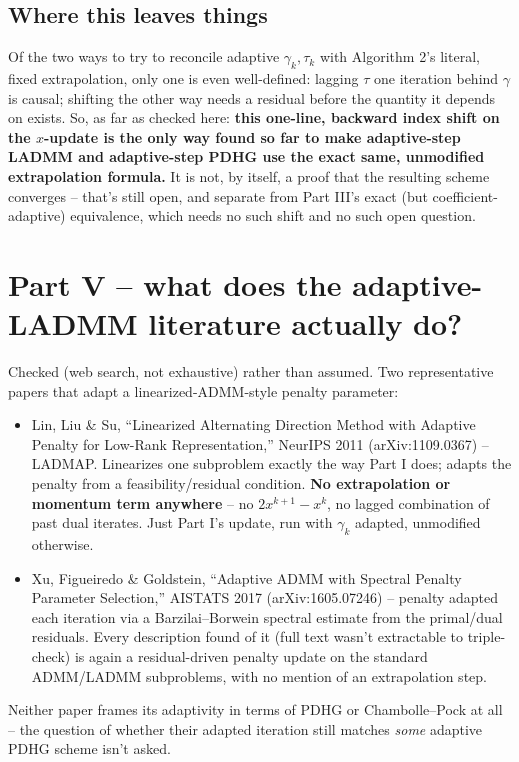 \documentclass[11pt]{article}
\begin{document}
\subsection*{Where this leaves things}
Of the two ways to try to reconcile adaptive $\gamma_k,\tau_k$ with Algorithm 2's
literal, fixed extrapolation, only one is even well-defined: lagging $\tau$ one
iteration behind $\gamma$ is causal; shifting the other way needs a residual before the
quantity it depends on exists. So, as far as checked here: \textbf{this one-line,
backward index shift on the $x$-update is the only way found so far to make
adaptive-step LADMM and adaptive-step PDHG use the exact same, unmodified extrapolation
formula.} It is not, by itself, a proof that the resulting scheme converges -- that's
still open, and separate from Part III's exact (but coefficient-adaptive) equivalence,
which needs no such shift and no such open question.

\section*{Part V -- what does the adaptive-LADMM literature actually do?}
Checked (web search, not exhaustive) rather than assumed. Two representative papers
that adapt a linearized-ADMM-style penalty parameter:
\begin{itemize}
\item Lin, Liu \& Su, ``Linearized Alternating Direction Method with Adaptive Penalty
for Low-Rank Representation,'' NeurIPS 2011 (arXiv:1109.0367) -- LADMAP. Linearizes one
subproblem exactly the way Part I does; adapts the penalty from a feasibility/residual
condition. \textbf{No extrapolation or momentum term anywhere} -- no $2x^{k+1}-x^k$, no
lagged combination of past dual iterates. Just Part I's update, run with $\gamma_k$
adapted, unmodified otherwise.
\item Xu, Figueiredo \& Goldstein, ``Adaptive ADMM with Spectral Penalty Parameter
Selection,'' AISTATS 2017 (arXiv:1605.07246) -- penalty adapted each iteration via a
Barzilai--Borwein spectral estimate from the primal/dual residuals. Every description
found of it (full text wasn't extractable to triple-check) is again a residual-driven
penalty update on the standard ADMM/LADMM subproblems, with no mention of an
extrapolation step.
\end{itemize}
Neither paper frames its adaptivity in terms of PDHG or Chambolle--Pock at all -- the
question of whether their adapted iteration still matches \emph{some} adaptive PDHG
scheme isn't asked.
\end{document}
